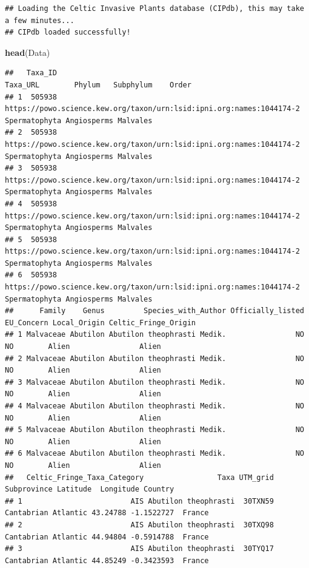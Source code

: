 \documentclass[
]{article}
\newenvironment{Shaded}{\begin{snugshade}}{\end{snugshade}}
\newcommand{\FunctionTok}[1]{\textcolor[rgb]{0.13,0.29,0.53}{\textbf{#1}}}
\newcommand{\NormalTok}[1]{#1}
\begin{document}
\begin{verbatim}
## Loading the Celtic Invasive Plants database (CIPdb), this may take a few minutes...
## CIPdb loaded successfully!
\end{verbatim}

\begin{Shaded}
\begin{Highlighting}[]
\FunctionTok{head}\NormalTok{(Data)}
\end{Highlighting}
\end{Shaded}

\begin{verbatim}
##   Taxa_ID                                                             Taxa_URL        Phylum   Subphylum    Order
## 1  505938 https://powo.science.kew.org/taxon/urn:lsid:ipni.org:names:1044174-2 Spermatophyta Angiosperms Malvales
## 2  505938 https://powo.science.kew.org/taxon/urn:lsid:ipni.org:names:1044174-2 Spermatophyta Angiosperms Malvales
## 3  505938 https://powo.science.kew.org/taxon/urn:lsid:ipni.org:names:1044174-2 Spermatophyta Angiosperms Malvales
## 4  505938 https://powo.science.kew.org/taxon/urn:lsid:ipni.org:names:1044174-2 Spermatophyta Angiosperms Malvales
## 5  505938 https://powo.science.kew.org/taxon/urn:lsid:ipni.org:names:1044174-2 Spermatophyta Angiosperms Malvales
## 6  505938 https://powo.science.kew.org/taxon/urn:lsid:ipni.org:names:1044174-2 Spermatophyta Angiosperms Malvales
##      Family    Genus         Species_with_Author Officially_listed EU_Concern Local_Origin Celtic_Fringe_Origin
## 1 Malvaceae Abutilon Abutilon theophrasti Medik.                NO         NO        Alien                Alien
## 2 Malvaceae Abutilon Abutilon theophrasti Medik.                NO         NO        Alien                Alien
## 3 Malvaceae Abutilon Abutilon theophrasti Medik.                NO         NO        Alien                Alien
## 4 Malvaceae Abutilon Abutilon theophrasti Medik.                NO         NO        Alien                Alien
## 5 Malvaceae Abutilon Abutilon theophrasti Medik.                NO         NO        Alien                Alien
## 6 Malvaceae Abutilon Abutilon theophrasti Medik.                NO         NO        Alien                Alien
##   Celtic_Fringe_Taxa_Category                 Taxa UTM_grid         Subprovince Latitude  Longitude Country
## 1                         AIS Abutilon theophrasti  30TXN59 Cantabrian Atlantic 43.24788 -1.1522727  France
## 2                         AIS Abutilon theophrasti  30TXQ98 Cantabrian Atlantic 44.94804 -0.5914788  France
## 3                         AIS Abutilon theophrasti  30TYQ17 Cantabrian Atlantic 44.85249 -0.3423593  France

\end{verbatim}
\end{document}
